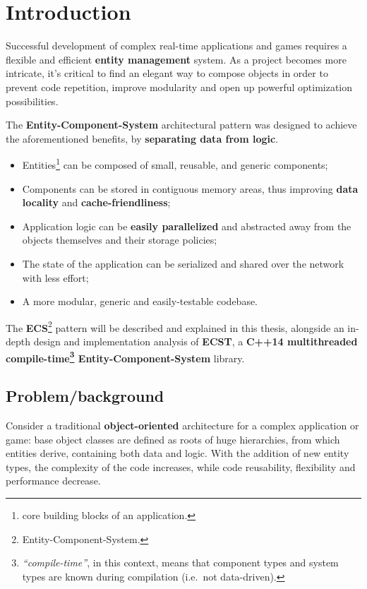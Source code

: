 \documentclass[twoside, 12pt, a4paper, openany]{book}
\begin{document}
\newpage

\tableofcontents

\chapter{Introduction}\label{introduction}

Successful development of complex real-time applications and games
requires a flexible and efficient \textbf{entity management} system. As
a project becomes more intricate, it's critical to find an elegant way
to compose objects in order to prevent code repetition, improve
modularity and open up powerful optimization possibilities.

The \textbf{Entity-Component-System} architectural pattern was designed
to achieve the aforementioned benefits, by \textbf{separating data from
logic}.

\begin{itemize}
\item
  Entities\footnote{core building blocks of an application.} can be
  composed of small, reusable, and generic components;
\item
  Components can be stored in contiguous memory areas, thus improving
  \textbf{data locality} and \textbf{cache-friendliness};
\item
  Application logic can be \textbf{easily parallelized} and abstracted
  away from the objects themselves and their storage policies;
\item
  The state of the application can be serialized and shared over the
  network with less effort;
\item
  A more modular, generic and easily-testable codebase.
\end{itemize}

The \textbf{ECS}\footnote{Entity-Component-System.} pattern will be
described and explained in this thesis, alongside an in-depth design and
implementation analysis of \textbf{ECST}, a \textbf{C++14 multithreaded
compile-time\footnote{\emph{``compile-time''}, in this context, means
  that component types and system types are known during compilation
  (i.e.~not data-driven).} Entity-Component-System} library.

\section{Problem/background}\label{problembackground}

Consider a traditional \textbf{object-oriented} architecture for a
complex application or game: base object classes are defined as roots of
huge hierarchies, from which entities derive, containing both data and
logic. With the addition of new entity types, the complexity of the code
increases, while code reusability, flexibility and performance decrease.
\end{document}
